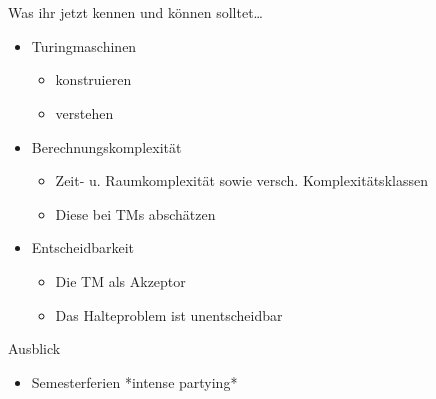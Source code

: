 \roadmap


\def\parfunc{\dashedrightarrow}



\section{}
	\begin{frame}{Was ihr jetzt kennen und können solltet\dots}
			\begin{itemize}
				\item Turingmaschinen
				\begin{itemize}
					\item konstruieren
					\item verstehen
				\end{itemize}
				\item Berechnungskomplexität
				\begin{itemize}
					\item Zeit- u. Raumkomplexität sowie versch. Komplexitätsklassen
					\item Diese bei TMs abschätzen
				\end{itemize}
				\item Entscheidbarkeit
				\begin{itemize}
					\item Die TM als Akzeptor
					\item Das Halteproblem ist unentscheidbar
				\end{itemize}
			\end{itemize}
	
	\end{frame}
	\begin{frame}{Ausblick}
		\begin{itemize}
			\item Semesterferien *intense partying*
		\end{itemize}
	\end{frame}
\section{}
\questionframe
{}
